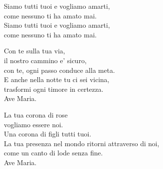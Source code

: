 

\spazio

\strofa Siamo tutti tuoi e vogliamo amarti,\\
come nessuno ti ha amato mai.\\
Siamo tutti tuoi e vogliamo amarti,\\
come nessuno ti ha amato mai.

\spazio


\spazio

\strofa Con te sulla tua via,\\
il nostro cammino e' sicuro,\\
con te, ogni passo conduce alla meta.\\
E anche nella notte tu ci sei vicina,\\
trasformi ogni timore in certezza.\\
Ave Maria.

\spazio


\spazio

\strofa La tua corona di rose\\
vogliamo essere noi.\\
Una corona di figli tutti tuoi.\\
La tua presenza nel mondo ritorni attraverso di noi,\\
come un canto di lode senza fine.\\
Ave Maria.

\spazio

